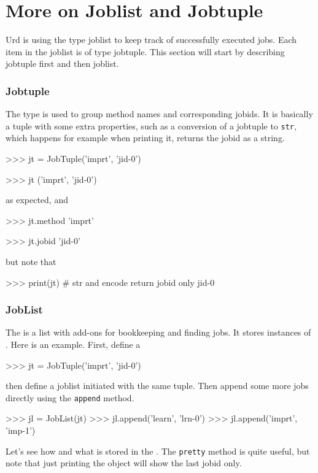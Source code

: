 \section{More on Joblist and Jobtuple}

Urd is using the type joblist to keep track of successfully executed
jobs.  Each item in the joblist is of type jobtuple.  This section
will start by describing jobtuple first and then joblist.

\subsubsection{Jobtuple}

The \jobtuple type is used to group method names and corresponding
jobids.  It is basically a tuple with some extra properties, such as a
conversion of a jobtuple to \texttt{str}, which happens for example
when printing it, returns the jobid as a string.

\begin{pythonBEG}
>>> jt = JobTuple('imprt', 'jid-0')

>>> jt
('imprt', 'jid-0')
\end{pythonBEG}
as expected, and

\begin{pythonMID}
>>> jt.method
'imprt'

>>> jt.jobid
'jid-0'
\end{pythonMID}
but note that

\begin{pythonEND}
>>> print(jt)  # str and encode return jobid only
jid-0
\end{pythonEND}



\subsubsection{JobList}

\label{sec:joblist}
The \joblist is a list with add-ons for bookkeeping and finding jobs.
It stores instances of \jobtuple.  Here is an example.  First, define
a \jobtuple

\begin{pythonBEG}
>>> jt = JobTuple('imprt', 'jid-0')
\end{pythonBEG}
then define a joblist initiated with the same tuple.  Then append some
more jobs directly using the \texttt{append} method.

\begin{pythonMID}
>>> jl = JobList(jt)
>>> jl.append('learn', 'lrn-0')
>>> jl.append('imprt', 'imp-1')
\end{pythonMID}
Let's see how and what is stored in the \joblist.  The \texttt{pretty}
method is quite useful, but note that just printing the object will
show the last jobid only.

